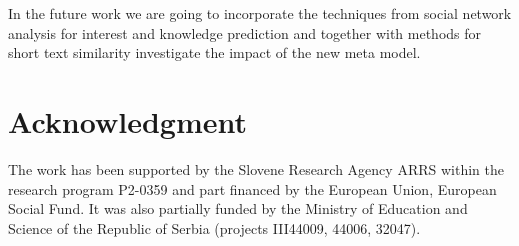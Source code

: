\documentclass[conference]{IEEEtran}
\begin{document}
In the future work we are going to incorporate the techniques from social network analysis for interest and knowledge prediction and together with methods for short text similarity investigate the impact of the new meta model.






\section*{Acknowledgment}
The work has been supported by the Slovene Research Agency ARRS within the research program P2-0359 and part financed by the European Union, European Social Fund. It was also partially funded by the Ministry of Education and Science of the Republic of Serbia (projects III44009, 44006, 32047).









%






\end{document}
